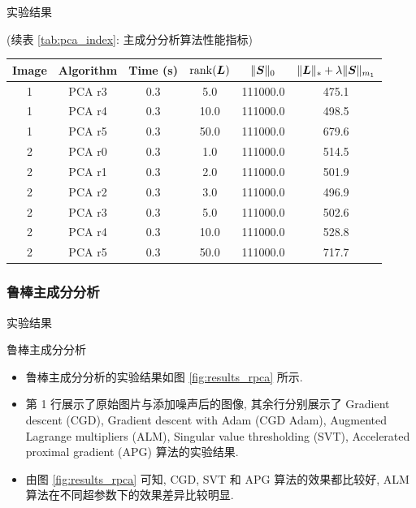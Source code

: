 \documentclass{beamer}
\begin{document}
\begin{frame}{实验结果}
  \centerline{(续表 \ref{tab:pca_index}: 主成分分析算法性能指标)}
  \begin{table}[H]
    \centering
    \small
    \begin{tabular}{cccccc}
      \toprule
      Image & Algorithm     & Time (s)  & $\operatorname{rank}(\bm{L})$ & $\|\bm{S}\|_0$  & $\|\bm{L}\|_{*}+\lambda\|\bm{S}\|_{m_1}$ \\
      \midrule
      1     & PCA r3    & 0.3      & 5.0         & 111000.0    & 475.1         \\
      1     & PCA r4    & 0.3      & 10.0        & 111000.0    & 498.5         \\
      1     & PCA r5    & 0.3      & 50.0        & 111000.0    & 679.6         \\
      2     & PCA r0    & 0.3      & 1.0         & 111000.0    & 514.5         \\
      2     & PCA r1    & 0.3      & 2.0         & 111000.0    & 501.9         \\
      2     & PCA r2    & 0.3      & 3.0         & 111000.0    & 496.9         \\
      2     & PCA r3    & 0.3      & 5.0         & 111000.0    & 502.6         \\
      2     & PCA r4    & 0.3      & 10.0        & 111000.0    & 528.8        \\
      2     & PCA r5    & 0.3      & 50.0        & 111000.0    & 717.7        \\
      \bottomrule
    \end{tabular}
  \end{table}
\end{frame}

\subsubsection{鲁棒主成分分析}

\begin{frame}{实验结果}
  \begin{block}{鲁棒主成分分析}
    \begin{itemize}
      \item 鲁棒主成分分析的实验结果如图 \ref{fig:results_rpca} 所示.
      \item 第 1 行展示了原始图片与添加噪声后的图像, 其余行分别展示了 Gradient descent (CGD), Gradient descent with Adam (CGD Adam), Augmented Lagrange multipliers (ALM), Singular value thresholding (SVT), Accelerated proximal gradient (APG) 算法的实验结果.
      \item 由图 \ref{fig:results_rpca} 可知, CGD, SVT 和 APG 算法的效果都比较好, ALM 算法在不同超参数下的效果差异比较明显.
    \end{itemize}
  \end{block}
\end{frame}
\end{document}
